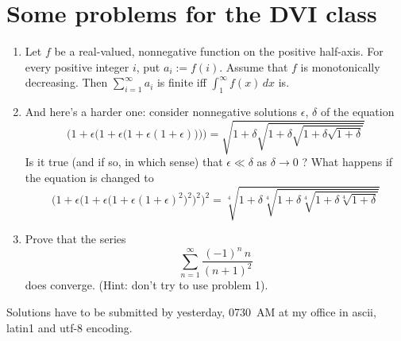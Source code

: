 \documentclass{article}
\begin{document}
\section*{Some problems for the DVI class}

\begin{enumerate}
\item
Let $f$ be a real-valued, nonnegative function on the positive half-axis.
For every positive integer $i$, put $a_i := f(i)$.
Assume that $f$ is monotonically decreasing. Then
$\sum_{i=1}^{\infty} a_i$ is finite iff $\int_1^{\infty} f(x)\,dx$ is.

\item
And here's a harder one: consider nonnegative solutions $\epsilon$,
$\delta$ of the equation
\[
\bigg(1 + \epsilon \Big(1 + \epsilon \big(1 + \epsilon (1 + \epsilon
    ) \big) \Big) \bigg) =
\sqrt{1 + \delta \sqrt {1 + \delta \sqrt {1 + \delta \sqrt{1 + \delta}}}}
\]
Is it true (and if so, in which sense) that $\epsilon \ll \delta$ as
$\delta \rightarrow 0$ ? What happens if the equation is changed to
\[
\bigg(1 + \epsilon \Big(1 + \epsilon \big(1 + \epsilon (1 + \epsilon
    )^2 \big)^2 \Big)^2 \bigg)^2 =
\sqrt[4]{1 + \delta \sqrt[4] {1 + \delta \sqrt[4] {1 + \delta \sqrt[4]{1 + \delta}}}}
\]

\item
Prove that the series
\[
\sum_{n=1}^{\infty} \frac{(-1)^n\,n}{(n+1)^2}
\]
does converge. (Hint: don't try to use problem 1).
\end{enumerate}
Solutions have to be submitted by yesterday, 0730~AM at my office in
ascii, latin1 and utf-8 encoding.
\end{document}
